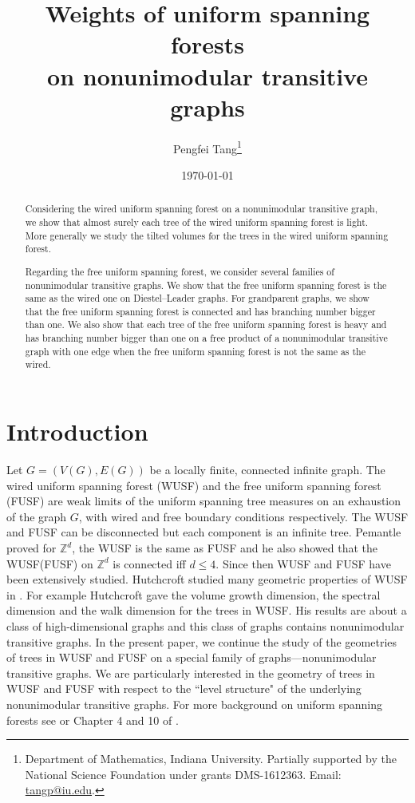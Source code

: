 \documentclass[12pt]{article}
\numberwithin{equation}{section}
\newcommand{\1}{\mathbf{1}}
\begin{document}
\title{Weights of uniform spanning forests\\ on nonunimodular transitive graphs}
\author{
	Pengfei Tang\thanks{Department of Mathematics, Indiana
		University. Partially supported by the National
		Science Foundation under grants DMS-1612363.
		Email: \protect\url{tangp@iu.edu}.}
}
\date{\today}
\maketitle
\begin{abstract}
Considering the wired uniform spanning forest on a nonunimodular transitive graph, we show that almost surely each tree of the wired uniform spanning forest is light. More generally we study the tilted volumes for the trees in the wired uniform spanning forest. 


Regarding the free uniform spanning forest, we consider several families of nonunimodular transitive graphs. We show that the free uniform spanning forest is the same as the wired one on  Diestel--Leader graphs. 
For grandparent graphs, we show that the free uniform spanning forest is connected and has branching number bigger than one. We also show that each tree of the free uniform spanning forest is heavy and has branching number bigger than one on  a free product of a nonunimodular transitive graph with one edge when the free uniform spanning forest is not the same as the wired. 
\end{abstract}



\section{Introduction}\label{sec:intro}
 Let $G=(V(G),E(G))$ be a locally finite, connected infinite graph. The wired uniform spanning forest (WUSF) and the free uniform spanning forest (FUSF) are weak limits of the uniform spanning tree measures on an exhaustion of the graph $G$, with wired and free boundary conditions respectively. The WUSF and FUSF can be disconnected but each component is an infinite tree. Pemantle \cite{Pem1991} proved for $\mathbb{Z}^d$, the WUSF is  the same as FUSF and he also showed that the WUSF(FUSF) on $\mathbb{Z}^d$ is connected iff $d\leq 4$. Since then  WUSF and FUSF have been extensively studied. Hutchcroft studied many geometric properties of WUSF in \cite{Hutchcroft2018a}. For example Hutchcroft gave the volume growth dimension, the spectral dimension and the walk dimension for the trees in WUSF. His results are about a class of high-dimensional graphs and this class of graphs contains nonunimodular transitive graphs. In the present paper, we continue the study of the geometries of trees in WUSF and FUSF on a special family of graphs---nonunimodular transitive graphs. We are particularly interested in the geometry of trees in WUSF and FUSF with respect to the ``level structure" of the underlying nonunimodular transitive graphs. For more background on uniform spanning forests see \cite{BLPS2001} or Chapter 4 and 10 of \cite{LP2016}.
 
\end{document}
